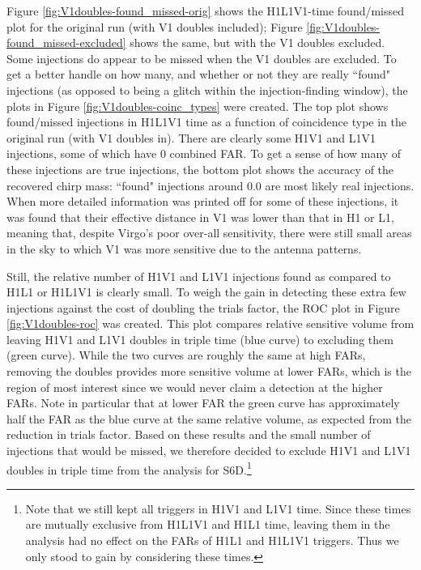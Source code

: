 Figure \ref{fig:V1doubles-found_missed-orig} shows the H1L1V1-time found/missed plot for the original run (with V1 doubles included); Figure \ref{fig:V1doubles-found_missed-excluded} shows the same, but with the V1 doubles excluded. Some injections do appear to be missed when the V1 doubles are excluded. To get a better handle on how many, and whether or not they are really ``found" injections (as opposed to being a glitch within the injection-finding window), the plots in Figure \ref{fig:V1doubles-coinc_types} were created. The top plot shows found/missed injections in H1L1V1 time as a function of coincidence type in the original run (with V1 doubles in). There are clearly some H1V1 and L1V1 injections, some of which have 0 combined \ac{FAR}. To get a sense of how many of these injections are true injections, the bottom plot shows the accuracy of the recovered chirp mass: ``found" injections around 0.0 are most likely real injections. When more detailed information was printed off for some of these injections, it was found that their effective distance in V1 was lower than that in H1 or L1, meaning that, despite Virgo's poor over-all sensitivity, there were still small areas in the sky to which V1 was more sensitive due to the antenna patterns.

Still, the relative number of H1V1 and L1V1 injections found as compared to H1L1 or H1L1V1 is clearly small. To weigh the gain in detecting these extra few injections against the cost of doubling the trials factor, the ROC plot in  Figure \ref{fig:V1doubles-roc} was created. This plot compares relative sensitive volume from leaving H1V1 and L1V1 doubles in triple time (blue curve) to excluding them (green curve). While the two curves are roughly the same at high \acp{FAR}, removing the doubles provides more sensitive volume at lower \acp{FAR}, which is the region of most interest since we would never claim a detection at the higher \acp{FAR}. Note in particular that at lower \ac{FAR} the green curve has approximately half the \ac{FAR} as the blue curve at the same relative volume, as expected from the reduction in trials factor. Based on these results and the small number of injections that would be missed, we therefore decided to exclude H1V1 and L1V1 doubles in triple time from the analysis for S6D.\footnote{Note that we still kept all triggers in H1V1 and L1V1 time. Since these times are mutually exclusive from H1L1V1 and H1L1 time, leaving them in the analysis had no effect on the \acp{FAR} of H1L1 and H1L1V1 triggers. Thus we only stood to gain by considering these times.}

